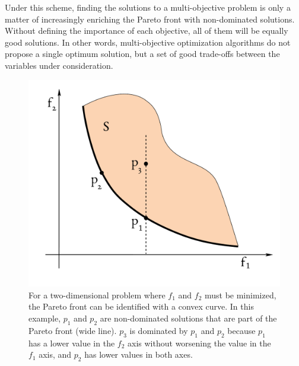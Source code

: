 Under this scheme, finding the solutions to a multi-objective problem is only a matter of increasingly enriching the Pareto front with non-dominated solutions. Without defining the importance of each objective, all of them will be equally good solutions. In other words, multi-objective optimization algorithms do not propose a single optimum solution, but a set of good trade-offs between the variables under consideration.\cite{coello2007evolutionary}


\begin{figure}[hbtp]
	\includegraphics[width=\textwidth]{./figures/02/FrentePareto.pdf}
	\caption[A Pareto front for two dimensions]{For a two-dimensional problem where $f_{1}$ and $f_{2}$ must be minimized, the Pareto front can be identified with a convex curve. In this example, $p_{1}$ and $p_{2}$ are non-dominated solutions that are part of the Pareto front (wide line). $p_{3}$ is dominated by $p_{1}$ and $p_{2}$ because $p_{1}$ has a lower value in the $f_{2}$ axis without worsening the value in the $f_{1}$ axis, and $p_{2}$ has lower values in both axes.}
	\label{fig:pareto}
\end{figure}



